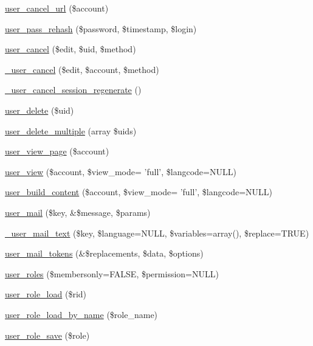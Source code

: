 \begin{DoxyCompactItemize}
\item 
\hyperlink{user_8module_afdf3514e3f6d0c8de3f68ff5e98452c2}{user\_\-cancel\_\-url} (\$account)
\item 
\hyperlink{user_8module_a1d3ca7bcffa02f5785618cd86efeac7d}{user\_\-pass\_\-rehash} (\$password, \$timestamp, \$login)
\item 
\hyperlink{user_8module_af6ef747e6353edaecc43f55dc85eff9e}{user\_\-cancel} (\$edit, \$uid, \$method)
\item 
\hyperlink{user_8module_afc9203f67609047039df65af5de60739}{\_\-user\_\-cancel} (\$edit, \$account, \$method)
\item 
\hyperlink{user_8module_ade553a108fdbcf811513ee0539aeebbe}{\_\-user\_\-cancel\_\-session\_\-regenerate} ()
\item 
\hyperlink{user_8module_aeed10f2e053a5b6ccb57e22937961c77}{user\_\-delete} (\$uid)
\item 
\hyperlink{user_8module_a3c8aa34b1ef0c113327f7151cb6f2e35}{user\_\-delete\_\-multiple} (array \$uids)
\item 
\hyperlink{user_8module_a93954fceea22b31ffafb20cd45d81c94}{user\_\-view\_\-page} (\$account)
\item 
\hyperlink{user_8module_aa5b236a0e9e2aad7ff06f23bc5046914}{user\_\-view} (\$account, \$view\_\-mode= 'full', \$langcode=NULL)
\item 
\hyperlink{user_8module_ab37696ec0ec393751b7cfb06146963f1}{user\_\-build\_\-content} (\$account, \$view\_\-mode= 'full', \$langcode=NULL)
\item 
\hyperlink{user_8module_a1398b4fdee5dad70d6da89ce5be6c43d}{user\_\-mail} (\$key, \&\$message, \$params)
\item 
\hyperlink{user_8module_afeb35780400f149e307cd4b4f1d358a1}{\_\-user\_\-mail\_\-text} (\$key, \$language=NULL, \$variables=array(), \$replace=TRUE)
\item 
\hyperlink{user_8module_a0685343e7877f453320a935cb2d9c5d1}{user\_\-mail\_\-tokens} (\&\$replacements, \$data, \$options)
\item 
\hyperlink{user_8module_a2c97e1595e6af351e0ab7d60da180017}{user\_\-roles} (\$membersonly=FALSE, \$permission=NULL)
\item 
\hyperlink{user_8module_a523043011b1e6d3f168ee7a5e8674734}{user\_\-role\_\-load} (\$rid)
\item 
\hyperlink{user_8module_a46775f7a4d73479dd21569ef97cb77ec}{user\_\-role\_\-load\_\-by\_\-name} (\$role\_\-name)
\item 
\hyperlink{user_8module_a4585f9898ea037730af8f3e6289c158d}{user\_\-role\_\-save} (\$role)

\end{DoxyCompactItemize}
